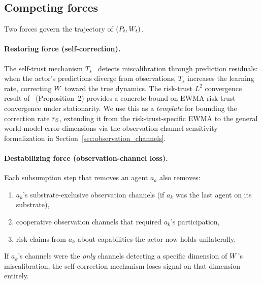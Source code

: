 \subsection{Competing forces}

Two forces govern the trajectory of $(P_t, W_t)$.

\paragraph{Restoring force (self-correction).}
The self-trust mechanism $T_s$~\citep[Appendix~B]{lasser2026gfm} detects
miscalibration through prediction residuals: when the actor's
predictions diverge from observations, $T_s$ increases the learning
rate, correcting $W$ toward the true dynamics.
The risk-trust $L^2$ convergence result of~\citet{lasser2026scm}
(Proposition~2) provides a concrete bound on EWMA risk-trust
convergence under stationarity.  We use this as a \emph{template} for
bounding the correction rate $r_{\mathrm{S}}$, extending it from the
risk-trust-specific EWMA to the general world-model error dimensions
via the observation-channel sensitivity formalization in
Section~\ref{sec:observation_channels}.

\paragraph{Destabilizing force (observation-channel loss).}
Each subsumption step that removes an agent $a_k$ also removes:
\begin{enumerate}
\item $a_k$'s substrate-exclusive observation channels (if $a_k$ was
  the last agent on its substrate),
\item cooperative observation channels that required $a_k$'s
  participation,
\item risk claims from $a_k$ about capabilities the actor now holds
  unilaterally.
\end{enumerate}
If $a_k$'s channels were the \emph{only} channels detecting a specific
dimension of $W$'s miscalibration, the self-correction mechanism
loses signal on that dimension entirely.
